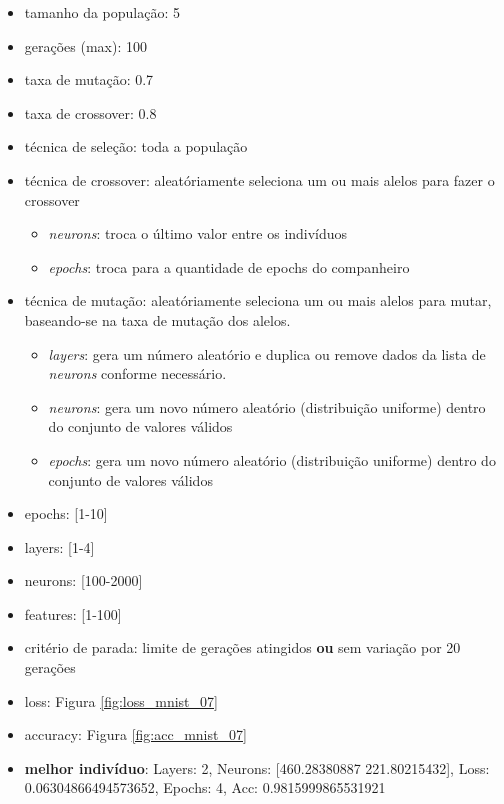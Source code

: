 \documentclass[twoside,conference,a4paper]{IEEEtran}
\begin{document}
\begin{itemize}
    \item tamanho da população: 5
    \item gerações (max): 100
    \item taxa de mutação: 0.7
    \item taxa de crossover: 0.8
    \item técnica de seleção: toda a população
    \item técnica de crossover: aleatóriamente seleciona um ou mais alelos para fazer o crossover
    \begin{itemize}
        \item \emph{neurons}: troca o último valor entre os indivíduos
        \item \emph{epochs}: troca para a quantidade de epochs do companheiro
    \end{itemize}
    \item técnica de mutação: aleatóriamente seleciona um ou mais alelos para mutar, baseando-se na taxa de mutação dos alelos.
    \begin{itemize}
        \item \emph{layers}: gera um número aleatório e duplica ou remove dados da lista de \emph{neurons} conforme necessário.
        \item \emph{neurons}: gera um novo número aleatório (distribuição uniforme) dentro do conjunto de valores válidos
        \item \emph{epochs}: gera um novo número aleatório (distribuição uniforme) dentro do conjunto de valores válidos
    \end{itemize}
    \item epochs: [1-10]
    \item layers: [1-4]
    \item neurons: [100-2000]
    \item features: [1-100]
    \item critério de parada: limite de gerações atingidos \textbf{ou} sem variação por 20 gerações
    \item loss: Figura \ref{fig:loss_mnist_07}
    \item accuracy: Figura \ref{fig:acc_mnist_07}
    \item \textbf{melhor indivíduo}: Layers: 2, Neurons: [460.28380887 221.80215432], Loss: 0.06304866494573652, Epochs: 4, Acc: 0.9815999865531921
\end{itemize}
\end{document}
